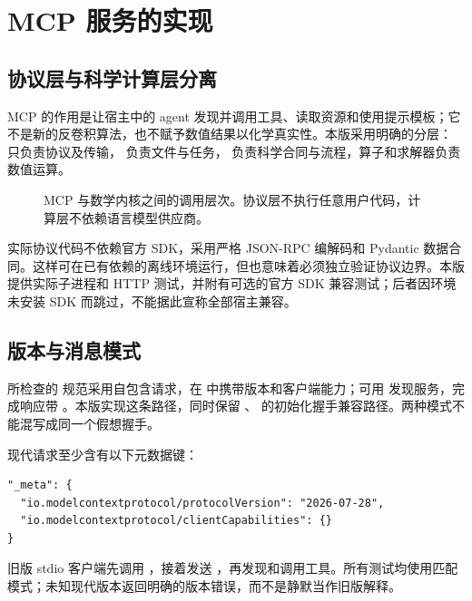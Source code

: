 \chapter{MCP 服务的实现}
\section{协议层与科学计算层分离}
MCP 的作用是让宿主中的 agent 发现并调用工具、读取资源和使用提示模板；它不是新的反卷积算法，也不赋予数值结果以化学真实性\cite{mcpbase,mcptools}。本版采用明确的分层： 只负责协议及传输， 负责文件与任务， 负责科学合同与流程，算子和求解器负责数值运算。

\begin{figure}[htbp]\centering
{}
\caption{MCP 与数学内核之间的调用层次。协议层不执行任意用户代码，计算层不依赖语言模型供应商。}
\end{figure}

实际协议代码不依赖官方 SDK，采用严格 JSON-RPC 编解码和 Pydantic 数据合同。这样可在已有依赖的离线环境运行，但也意味着必须独立验证协议边界。本版提供实际子进程和 HTTP 测试，并附有可选的官方 SDK 兼容测试；后者因环境未安装 SDK 而跳过，不能据此宣称全部宿主兼容。

\section{版本与消息模式}
所检查的  规范采用自包含请求，在  中携带版本和客户端能力；可用  发现服务，完成响应带 \cite{mcpversion,mcpdiscover}。本版实现这条路径，同时保留 、 的初始化握手兼容路径。两种模式不能混写成同一个假想握手。

现代请求至少含有以下元数据键：
\par\noindent\begin{minipage}{\linewidth}
\begin{lstlisting}
"_meta": {
  "io.modelcontextprotocol/protocolVersion": "2026-07-28",
  "io.modelcontextprotocol/clientCapabilities": {}
}
\end{lstlisting}
\end{minipage}\par
旧版 stdio 客户端先调用 ，接着发送 ，再发现和调用工具。所有测试均使用匹配模式；未知现代版本返回明确的版本错误，而不是静默当作旧版解释。

